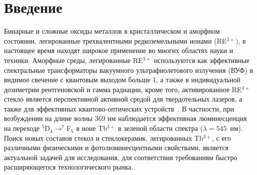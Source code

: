 \documentclass[press]{vestnik}
\begin{document}


\date{5-06-2024}

\maketitle[.97]

\section*{Введение}

Бинарные и сложные оксиды металлов в кристаллическом и аморфном состоянии, 
легированные трехвалентными редкоземельными ионами (RE$^{3+})$, в настоящее 
время находят широкое применение во многих областях науки и техники. 
Аморфные среды, легированные RE$^{3+}$ используются как эффективные 
спектральные трансформаторы вакуумного ультрафиолетового излучения (ВУФ) в 
видимое свечение с квантовым выходом больше 1, а также в индивидуальной 
дозиметрии рентгеновской и гамма радиации, кроме того, активированное 
RE$^{3+}$ стекло является перспективной активной средой для твердотельных 
лазеров, а также для эффективных квантово-оптических устройств~\cite{B01,B02,B03,B04,B05}. В 
частности, при возбуждении на длине волны 369 нм наблюдается эффективная 
люминесценция на переходе $^{5}$D$_{4}\to^{7}$F$_{5}$ в ионе Tb$^{3+}$ 
в зеленой области спектра ($\lambda = 545$~нм). Поиск новых составов 
стекол и стеклокерамик, легированных Tb$^{3+}$, с его различными физическими 
и фотолюминесцентными свойствами, является актуальной задачей для 
исследования, для соответствия требованиям быстро расширяющегося 
технологического рынка.
\end{document}
